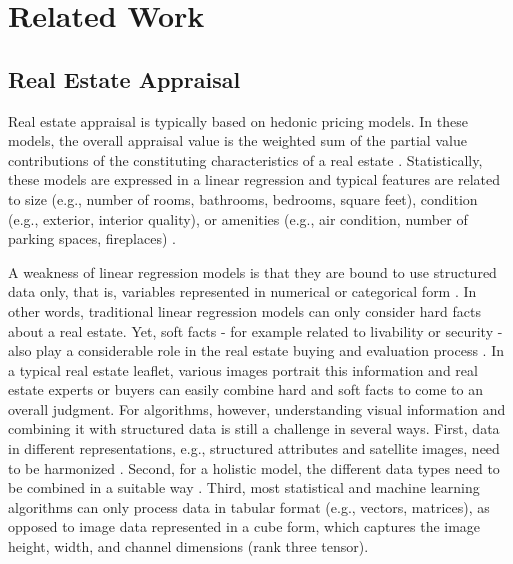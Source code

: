 \documentclass[letterpaper]{article}
\begin{document}
\section{Related Work}
\subsection{Real Estate Appraisal}
Real estate appraisal is typically based on hedonic pricing models. In these models, the overall appraisal value is the weighted sum of the partial value contributions of the constituting characteristics of a real estate \cite{lancaster1966new, rosen1974hedonic}. Statistically, these models are expressed in a linear regression and typical features are related to size (e.g., number of rooms, bathrooms, bedrooms, square feet), condition (e.g., exterior, interior quality), or amenities (e.g., air condition, number of parking spaces, fireplaces) \cite{ligus2016measuring, limsombunchai2004house, helbich2013boosting, hill2018can, park2015using}.

A weakness of linear regression models is that they are bound to use structured data only, that is, variables represented in numerical or categorical form \cite{law2019take}. In other words, traditional linear regression models can only consider hard facts about a real estate. Yet, soft facts - for example related to livability or security - also play a considerable role in the real estate buying and evaluation process \cite{law2019take}. In a typical real estate leaflet, various images portrait this information and real estate experts or buyers can easily combine hard and soft facts to come to an overall judgment. For algorithms, however, understanding visual information and combining it with structured data is still a challenge in several ways. First, data in different representations, e.g., structured attributes and satellite images, need to be harmonized \cite{liu2018learning}. Second, for a holistic model, the different data types need to be combined in a suitable way \cite{liu2018learning}. Third, most statistical and machine learning algorithms can only process data in tabular format (e.g., vectors, matrices), as opposed to image data represented in a cube form, which captures the image height, width, and channel dimensions (rank three tensor).
\end{document}
